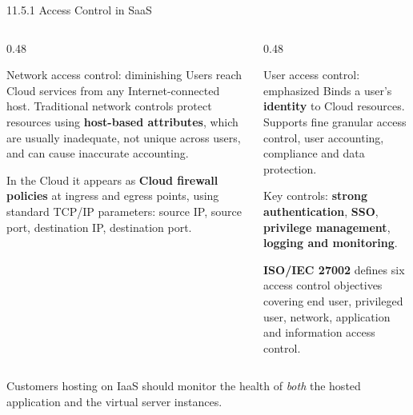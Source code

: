 \documentclass[11pt,aspectratio=169]{beamer}
\newcommand{\kw}[1]{\textbf{\color{accent}#1}}
\begin{document}
\begin{frame}{11.5.1 Access Control in SaaS}
  \begin{columns}[T,onlytextwidth]
    \begin{column}{0.48\textwidth}
      \begin{block}{Network access control: diminishing}
        \scriptsize
        Users reach Cloud services from any Internet-connected host.
        Traditional network controls protect resources using
        \kw{host-based attributes}, which are usually inadequate, not unique
        across users, and can cause inaccurate accounting.
        \vspace{0.4em}

        In the Cloud it appears as \kw{Cloud firewall policies} at ingress and
        egress points, using standard TCP/IP parameters: source IP, source
        port, destination IP, destination port.
      \end{block}
    \end{column}
    \begin{column}{0.48\textwidth}
      \begin{block}{User access control: emphasized}
        \scriptsize
        Binds a user's \kw{identity} to Cloud resources. Supports fine granular
        access control, user accounting, compliance and data protection.
        \vspace{0.4em}

        Key controls: \kw{strong authentication}, \kw{SSO},
        \kw{privilege management}, \kw{logging and monitoring}.
        \vspace{0.4em}

        \kw{ISO/IEC 27002} defines six access control objectives covering end
        user, privileged user, network, application and information access
        control.
      \end{block}
    \end{column}
  \end{columns}
  \vspace{0.7em}
  {\footnotesize\color{accentmid}
  Customers hosting on IaaS should monitor the health of \emph{both} the hosted
  application and the virtual server instances.}
\end{frame}
\end{document}
